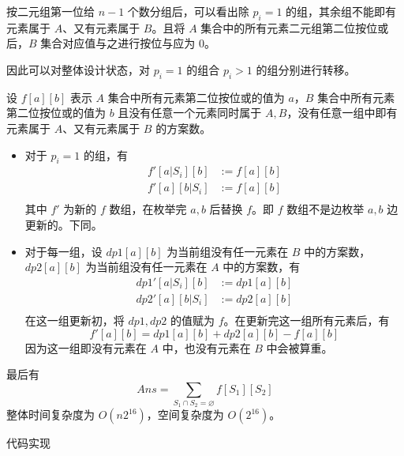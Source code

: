 按二元组第一位给 \(n-1\) 个数分组后，可以看出除 \(p_i=1\)
的组，其余组不能即有元素属于 \(A\)、又有元素属于 \(B\)。且将 \(A\)
集合中的所有元素二元组第二位按位或后，\(B\) 集合对应值与之进行按位与应为
\(0\)。

因此可以对整体设计状态，对 \(p_i=1\) 的组合 \(p_i\gt1\)
的组分别进行转移。

设 \(f[a][b]\) 表示 \(A\) 集合中所有元素第二位按位或的值为 \(a\)，\(B\)
集合中所有元素第二位按位或的值为 \(b\) 且没有任意一个元素同时属于
\(A,B\)，没有任意一组中即有元素属于 \(A\)、又有元素属于 \(B\) 的方案数。

\begin{itemize}
\item
  对于 \(p_i=1\) 的组，有 \[
  \begin{aligned}
  f'[a|S_i][b]&:=f[a][b]\\
  f'[a][b|S_i]&:=f[a][b]\\
  \end{aligned}
  \] 其中 \(f'\) 为新的 \(f\) 数组，在枚举完 \(a,b\) 后替换 \(f\)。即
  \(f\) 数组不是边枚举 \(a,b\) 边更新的。下同。
\item
  对于每一组，设 \(dp1[a][b]\) 为当前组没有任一元素在 \(B\) 中的方案数，
  \(dp2[a][b]\) 为当前组没有任一元素在 \(A\) 中的方案数，有 \[
  \begin{aligned}
  dp1'[a|S_i][b]&:=dp1[a][b]\\
  dp2'[a][b|S_i]&:=dp2[a][b]\\
  \end{aligned}
  \] 在这一组更新初，将 \(dp1,dp2\) 的值赋为
  \(f\)。在更新完这一组所有元素后，有 \[
  f'[a][b]=dp1[a][b]+dp2[a][b]-f[a][b]
  \] 因为这一组即没有元素在 \(A\) 中，也没有元素在 \(B\) 中会被算重。
\end{itemize}

最后有 \[
Ans=\sum_{S_1\cap S_2=\varnothing}f[S_1][S_2]
\] 整体时间复杂度为 \(O(n2^{16})\)，空间复杂度为 \(O(2^{16})\)。

代码实现


